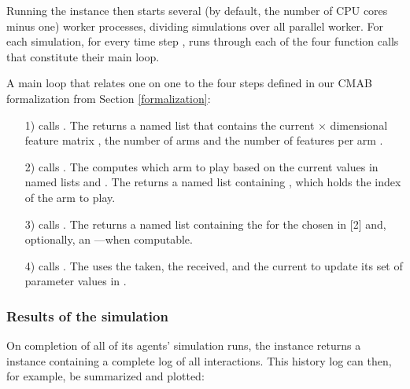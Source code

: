 \documentclass{jss}
\begin{document}
Running the  instance then starts several (by default, the number of CPU cores minus one) worker processes, dividing simulations over all parallel worker. For each simulation, for every time step ,  runs through each of the four function calls that constitute their main loop.

A main loop that relates one on one to the four steps defined in our CMAB formalization from Section \ref{formalization}:

\begin{enumerate}
         \item[1)]  calls . The  returns a named list that contains the current  $\times$  dimensional feature matrix , the number of arms  and the number of features per arm .
         \item[2)]  calls . The  computes which arm to play based on the current values in named lists  and . The  returns a named list containing , which holds the index of the arm to play.
         \item[3)]  calls . The  returns a named list containing the  for the  chosen in [2] and, optionally, an ---when computable.
         \item[4)]  calls . The  uses the  taken, the  received, and the current  to update its set of parameter values in .
\end{enumerate}

\subsubsection{Results of the simulation}

On completion of all of its agents' simulation runs, the  instance returns a  instance containing a complete log of all interactions. This history log can then, for example, be summarized and plotted:
\end{document}

